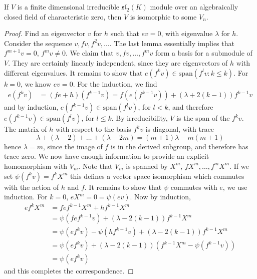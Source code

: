 \begin{theorem}
    If $V$ is a finite dimensional irreducible $\mathfrak{sl}_2(K)$ module over an algebraically closed field of characteristic zero, then $V$ is isomorphic to some $V_n$.
\end{theorem}
\begin{proof}
    Find an eigenvector $v$ for $h$ such that $ev = 0$, with eigenvalue $\lambda$ for $h$. Consider the sequence $v, fv, f^2 v, \dots$. The last lemma essentially implies that $f^{m+1} v = 0$, $f^m v \neq 0$. We claim that $v, fv, \dots, f^m v$ form a basis for a submodule of $V$. They are certainly linearly independent, since they are eigenvectors of $h$ with different eigenvalues. It remains to show that $e(f^k v) \in \text{span}(f^l v : k \leq k)$. For $k = 0$, we know $ev = 0$. For the induction, we find
    \begin{align*}
        e(f^k v) &= (f e + h) (f^{k-1} v) = f(e(f^{k-1} v)) + (\lambda + 2(k-1)) f^{k-1} v
    \end{align*}
    and by induction, $e(f^{k-1} v) \in \text{span}(f^l v)$, for $l < k$, and therefore $e(f^{k-1} v) \in \text{span}(f^l v)$, for $l \leq k$. By irreducibility, $V$ is the span of the $f^k v$. The matrix of $h$ with respect to the basis $f^k v$ is diagonal, with trace
    \[ \lambda + (\lambda - 2) + \dots + (\lambda - 2m) = (m+1) \lambda - m(m+1) \]
    hence $\lambda = m$, since the image of $f$ is in the derived subgroup, and therefore has trace zero. We now have enough information to provide an explicit homomorphism with $V_m$. Note that $V_m$ is spanned by $X^m$, $fX^m, \dots, f^m X^m$. If we set $\psi(f^k v) = f^k X^m$ this defines a vector space isomorphism which commutes with the action of $h$ and $f$. It remains to show that $\psi$ commutes with $e$, we use induction. For $k = 0$, $eX^m = 0 = \psi(ev)$. Now by induction,
    \begin{align*}
        ef^k X^m &= f e f^{k-1} X^m + h f^{k-1} X^m\\
        &= \psi(f e f^{k-1} v) + (\lambda - 2(k-1)) f^{k-1} X^m \\
        &= \psi(ef^k v) - \psi(hf^{k-1} v) + (\lambda - 2(k-1)) f^{k-1} X^m\\
        &= \psi(ef^k v) + (\lambda - 2(k-1))(f^{k-1} X^m - \psi(f^{k-1} v))\\
        &= \psi(ef^k v)
    \end{align*}
    and this completes the correspondence.
\end{proof}

